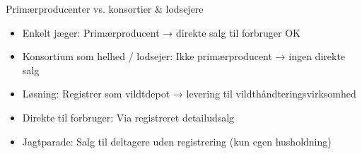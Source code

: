 \begin{frame}{Primærproducenter vs. konsortier \& lodsejere}
    \begin{itemize}
        \item Enkelt jæger: Primærproducent → direkte salg til forbruger OK
        \item Konsortium som helhed / lodsejer: Ikke primærproducent → ingen direkte salg
        \item Løsning: Registrer som vildtdepot → levering til vildthåndteringsvirksomhed
        \item Direkte til forbruger: Via registreret detailudsalg
        \item Jagtparade: Salg til deltagere uden registrering (kun egen husholdning)
    \end{itemize}
\end{frame}